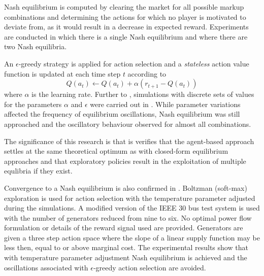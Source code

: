 Nash equilibrium is computed by clearing the market for all possible markup
combinations and determining the actions for which no player is motivated to
deviate from, as it would result in a decrease in expected reward. Experiments
are conducted in which there is a single Nash equilibrium and where there
are two Nash equilibria.

An $\epsilon$-greedy strategy is applied for action selection and a
\textit{stateless} action value function is updated at each time step $t$
according to
\begin{equation}
Q(a_t) \leftarrow Q(a_t) + \alpha(r_{t+1} - Q(a_t))
\end{equation}
where $\alpha$ is the learning rate.  Further to \cite{krause:nash04},
simulations with discrete sets of values for the parameters $\alpha$ and
$\epsilon$ were carried out in \cite{krause:nash06}.  While parameter
variations affected the frequency of equilibrium oscillations, Nash equilibrium
was still approached and the oscillatory behaviour observed for almost all
combinations.

The significance of this research is that is verifies that the agent-based
approach settles at the same theoretical optimum as with closed-form
equilibrium approaches and that exploratory policies result in the exploitation
of multiple equlibria if they exist.

Convergence to a Nash equilibrium is also confirmed in \cite{sistani:06}.
Boltzman (soft-max) exploration is used for action selection with the temperature
parameter adjusted during the simulations.  A modified version of the IEEE 30
bus test system is used with the number of generators reduced from nine to
six.  No optimal power flow formulation or details of the reward signal used
are provided.  Generators are given a three step action space where the slope of a
linear supply function may be less then, equal to or above marginal cost.  The
experimental results show that with temperature parameter adjustment Nash
equilibrium is achieved and the oscillations associated with $\epsilon$-greedy
action selection are avoided.

